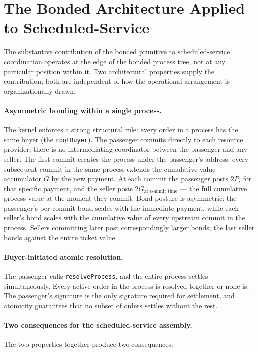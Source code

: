 \documentclass[11pt,a4paper]{article}
\theoremstyle{definition}
\theoremstyle{remark}
\begin{document}
\section{The Bonded Architecture Applied to Scheduled-Service}
\label{sec:assembly}

The substantive contribution of the bonded primitive to
scheduled-service coordination operates at the edge of the bonded
process tree, not at any particular position within it. Two
architectural properties supply the contribution; both are
independent of how the operational arrangement is organizationally
drawn.

\paragraph{Asymmetric bonding within a single process.}
The kernel enforces a strong structural rule: every order in a
process has the same buyer (the \texttt{rootBuyer}). The
passenger commits directly to each resource provider; there is
no intermediating coordinator between the passenger and any
seller. The first commit creates the process under the
passenger's address; every subsequent commit in the same process
extends the cumulative-value accumulator $G$ by the new payment.
At each commit the passenger posts $2P_i$ for that specific
payment, and the seller posts $2G_{\text{at commit time}}$ ---
the full cumulative process value at the moment they commit.
Bond posture is asymmetric: the passenger's per-commit bond
scales with the immediate payment, while each seller's bond
scales with the cumulative value of every upstream commit in the
process. Sellers committing later post correspondingly larger
bonds; the last seller bonds against the entire ticket value.

\paragraph{Buyer-initiated atomic resolution.}
The passenger calls \texttt{resolveProcess}, and the entire
process settles simultaneously. Every active order in the process
is resolved together or none is. The passenger's signature is the
only signature required for settlement, and atomicity guarantees
that no subset of orders settles without the rest.

\paragraph{Two consequences for the scheduled-service assembly.}
The two properties together produce two consequences.
\end{document}
